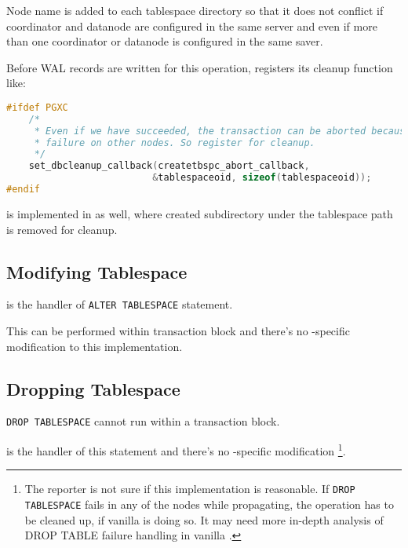   Node name is added to each tablespace directory so that it does not conflict if coordinator and
  datanode are configured in the same server and even if more than one coordinator or datanode is
  configured in the same saver.
  
  Before WAL records are written for this operation,  registers its
  cleanup function like:

\begin{lstlisting}[frame=single, tabsize=4, language=C]
#ifdef PGXC
    /*
     * Even if we have succeeded, the transaction can be aborted because of
     * failure on other nodes. So register for cleanup.
     */
    set_dbcleanup_callback(createtbspc_abort_callback,
                          &tablespaceoid, sizeof(tablespaceoid));
#endif
\end{lstlisting}

   is implemented in  as well, where
  created subdirectory under the tablespace path is removed for cleanup.



\subsection{Modifying Tablespace}

   is the handler of \texttt{ALTER TABLESPACE} statement.
  
  This can be performed within transaction block and there's no \XC-specific modification
  to this implementation.
  
  \subsection{Dropping Tablespace}
  
  \texttt{DROP TABLESPACE} cannot run within a transaction block.
  
   is the handler of this statement and there's no
  \XC-specific modification
  \footnote{
  	The reporter is not sure if this implementation is reasonable.
  	If \texttt{DROP TABLESPACE} fails in any of the nodes while propagating,
  	the operation has to be cleaned up, if vanilla \PG{} is doing so.
  	It may need more in-depth analysis of DROP TABLE failure handling in vanilla \PG.
  }.
  
